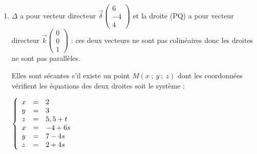 \documentclass[10pt]{article}
\providecommand{\R}{\mathbb{R}}
\providecommand{\vect}[1]{\overrightarrow{#1}}
\begin{document}
\begin{enumerate}
\begin{enumerate}
On a $M(x~;~y~;~z) \in (\text{PQ}) \iff \vect{\text{Q}M} = t\vect{k}, \quad (t \in \R) \iff \left\{\begin{array}{l c l}
x - 2 &=& 0t\\
y - 3&=&0t\\
z - 5,5&=&1t
\end{array}\right.\iff \left\{\begin{array}{l c l}
x &=& 2\\
y &=&3\\
z &=&5,5 + t
\end{array}\right., \quad (t \in \R)$.
		\item 
Les coordonnées du point P vérifient les équations paramétriques de la droite (PQ) et du plan (EFS), donc du système :

$\left\{\begin{array}{l c l}
x &=&2\\
y &=&3\\
z &=&5,5 + t\\
y + z &=& 8
\end{array}\right. \Rightarrow 3 + 5,5 + t  = 8 \iff t = - 0,5$.

Conclusion : P(2~;~3~;~5).
		\item 
On a PQ$^2 = (2 - 2)^2 + (3 - 3)^2 + (5,5 - 5)^2 = 0,25$ , donc PQ $ = 0,5$.
	\end{enumerate}	








\item 
$\Delta$ a pour vecteur directeur $\vect{\delta}\begin{pmatrix}6\\-4\\4\end{pmatrix}$ et la droite (PQ) a pour vecteur directeur $\vect{k}\begin{pmatrix}0\\0\\1\end{pmatrix}$ : ces deux vecteurs ne sont pas colinéaires donc les droites ne sont pas parallèles.

Elles sont sécantes s'il existe un point $M(x~;~y~;~z)$ dont les coordonnées vérifient les équations des deux droites soit le système :

$\left\{\begin{array}{l c l}
x &=&2\\
y &=&3\\
z &=&5,5 + t\\
x & =& -4 + 6s\\
y &=& 7 - 4s\\
z &=& 2 + 4s
\end{array}\right.$


\end{enumerate}
\end{document}
